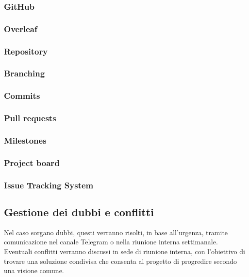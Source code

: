         \subsubsection{GitHub}
        \subsubsection{Overleaf}
        \subsubsection{Repository}
        \subsubsection{Branching}
        \subsubsection{Commits}
        \subsubsection{Pull requests}
        \subsubsection{Milestones}
        \subsubsection{Project board}
        \subsubsection{Issue Tracking System}

    \subsection{Gestione dei dubbi e conflitti}
        Nel caso sorgano dubbi, questi verranno risolti, in base all’urgenza, 
        tramite comunicazione nel canale Telegram o nella riunione interna 
        settimanale. \\Eventuali conflitti verranno discussi in sede di riunione 
        interna, con l’obiettivo di trovare una soluzione condivisa che consenta 
        al progetto di progredire secondo una visione comune.
